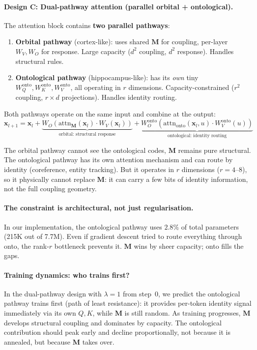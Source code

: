 \documentclass[11pt, a4paper]{article}
\newcommand{\M}{\mathbf{M}}
\newcommand{\x}{\mathbf{x}}
\theoremstyle{remark}
\begin{document}
\paragraph{Design C: Dual-pathway attention (parallel orbital + ontological).}
The attention block contains \textbf{two parallel pathways}:

\begin{enumerate}[nosep]
    \item \textbf{Orbital pathway} (cortex-like): uses shared $\M$ for coupling, per-layer $W_V, W_O$ for response.
    Large capacity ($d^2$ coupling, $d^2$ response). Handles structural rules.

    \item \textbf{Ontological pathway} (hippocampus-like): has its \emph{own} tiny $W_Q^{\text{onto}}, W_K^{\text{onto}}, W_V^{\text{onto}}$, all operating in $r$ dimensions.
    Capacity-constrained ($r^2$ coupling, $r \times d$ projections). Handles identity routing.
\end{enumerate}

\noindent
Both pathways operate on the same input and combine at the output:
\[
    \x_{l+1} = \x_l + \underbrace{W_O \left(\text{attn}_{\M}(\x_l) \cdot W_V(\x_l)\right)}_{\text{orbital: structural response}} + \underbrace{W_O^{\text{onto}} \left(\text{attn}_{\text{onto}}(\x_l, u) \cdot W_V^{\text{onto}}(u)\right)}_{\text{ontological: identity routing}}
\]

The orbital pathway cannot see the ontological codes, $\M$ remains pure structural.
The ontological pathway has its own attention mechanism and can route by identity (coreference, entity tracking).
But it operates in $r$ dimensions ($r = 4$--$8$), so it physically cannot replace $\M$: it can carry a few bits of identity information, not the full coupling geometry.

\paragraph{The constraint is architectural, not just regularisation.}
In our implementation, the ontological pathway uses $2.8\%$ of total parameters (215K out of 7.7M).
Even if gradient descent tried to route everything through onto, the rank-$r$ bottleneck prevents it.
$\M$ wins by sheer capacity; onto fills the gaps.

\paragraph{Training dynamics: who trains first?}
In the dual-pathway design with $\lambda = 1$ from step~0, we predict the ontological pathway trains first (path of least resistance): it provides per-token identity signal immediately via its own $Q, K$, while $\M$ is still random.
As training progresses, $\M$ develops structural coupling and dominates by capacity.
The ontological contribution should peak early and decline proportionally, not because it is annealed, but because $\M$ takes over.
\end{document}
